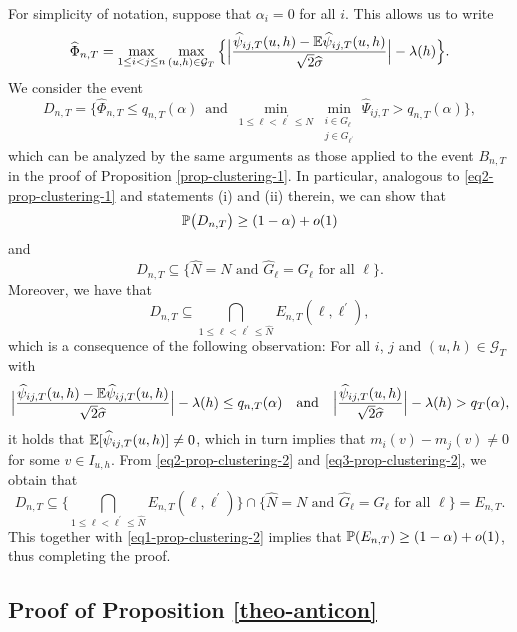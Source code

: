 For simplicity of notation, suppose that $\alpha_i = 0$ for all $i$. This allows us to write 
\[ \widehat{\Phi}_{n,T} = \max_{1 \le i < j \le n} \max_{(u,h) \in \mathcal{G}_T} \Big\{ \Big| \frac{\widehat{\psi}_{ij,T}(u,h)- \mathbb{E} \widehat{\psi}_{ij,T}(u,h)} {\sqrt{2}\widehat{\sigma}} \Big| - \lambda(h) \Big \}. \]
We consider the event
\[ D_{n,T} = \Big\{ \widehat{\Phi}_{n,T} \le q_{n,T}(\alpha) \, \text{ and } \,  \min_{1 \le \ell < \ell^\prime \le N} \min_{\substack{i \in G_\ell \\ j \in G_{\ell^\prime}}} \widehat{\Psi}_{ij,T} > q_{n,T}(\alpha) \Big\}, \]
which can be analyzed by the same arguments as those applied to the event $B_{n,T}$ in the proof of Proposition \ref{prop-clustering-1}. In particular, analogous to \eqref{eq2-prop-clustering-1} and statements (i) and (ii) therein, we can show that 
\begin{equation}\label{eq1-prop-clustering-2}
\mathbb{P} \big( D_{n,T} \big) \ge (1-\alpha) + o(1)
\end{equation}
and 
\begin{equation}\label{eq2-prop-clustering-2}
D_{n,T} \subseteq \big\{ \widehat{N} = N \text{ and } \widehat{G}_\ell = G_\ell \text{ for all } \ell \big\}.
\end{equation}
Moreover, we have that
\begin{equation}\label{eq3-prop-clustering-2}
D_{n,T} \subseteq \bigcap_{1 \le \ell < \ell^\prime \le \widehat{N}} E_{n,T}(\ell,\ell^\prime),
\end{equation}
which is a consequence of the following observation: For all $i$, $j$ and $(u,h) \in \mathcal{G}_T$ with 
\[ \Big|\frac{\widehat{\psi}_{ij,T}(u,h) - \mathbb{E} \widehat{\psi}_{ij,T}(u,h)}{\sqrt{2} \widehat{\sigma}}\Big| - \lambda(h) \le q_{n,T}(\alpha) \quad \text{and} \quad \Big|\frac{\widehat{\psi}_{ij,T}(u,h)}{\sqrt{2} \widehat{\sigma}}\Big| - \lambda(h) > q_T(\alpha), \]
it holds that $\mathbb{E}[\widehat{\psi}_{ij,T}(u,h)] \ne 0$, which in turn implies that $m_i(v) - m_j(v) \ne 0$ for some $v \in I_{u,h}$. From \eqref{eq2-prop-clustering-2} and \eqref{eq3-prop-clustering-2}, we obtain that 
\[ D_{n,T} \subseteq \Big\{ \bigcap_{1 \le \ell < \ell^\prime \le \widehat{N}} E_{n,T}(\ell,\ell^\prime) \Big\} \cap \big\{ \widehat{N} = N \text{ and } \widehat{G}_\ell = G_\ell \text{ for all } \ell \big\} = E_{n,T}. \] 
This together with \eqref{eq1-prop-clustering-2} implies that $\mathbb{P}(E_{n,T}) \ge (1-\alpha) + o(1)$, thus completing the proof. 



\subsection*{Proof of Proposition \ref{theo-anticon}}

